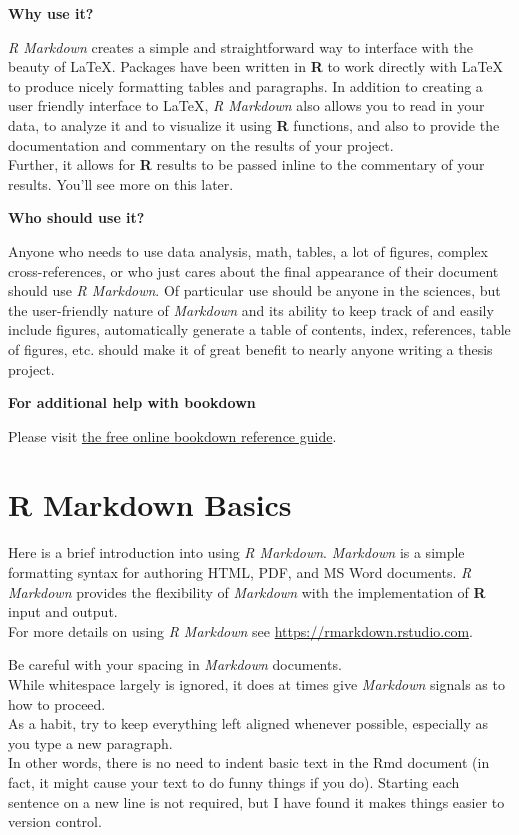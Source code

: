 \documentclass[12pt,oneside]{tisemthesis}
\begin{document}
\textbf{Why use it?}

\emph{R Markdown} creates a simple and straightforward way to interface with the beauty of LaTeX. Packages have been written in \textbf{R} to work directly with LaTeX to produce nicely formatting tables and paragraphs. In addition to creating a user friendly interface to LaTeX, \emph{R Markdown} also allows you to read in your data, to analyze it and to visualize it using \textbf{R} functions, and also to provide the documentation and commentary on the results of your project.\\
Further, it allows for \textbf{R} results to be passed inline to the commentary of your results. You'll see more on this later.

\textbf{Who should use it?}

Anyone who needs to use data analysis, math, tables, a lot of figures, complex cross-references, or who just cares about the final appearance of their document should use \emph{R Markdown}. Of particular use should be anyone in the sciences, but the user-friendly nature of \emph{Markdown} and its ability to keep track of and easily include figures, automatically generate a table of contents, index, references, table of figures, etc. should make it of great benefit to nearly anyone writing a thesis project.

\textbf{For additional help with bookdown}

Please visit \href{https://bookdown.org/yihui/bookdown/}{the free online bookdown reference guide}.

\hypertarget{rmd-basics}{%
\chapter{R Markdown Basics}\label{rmd-basics}}

Here is a brief introduction into using \emph{R Markdown}. \emph{Markdown} is a simple formatting syntax for authoring HTML, PDF, and MS Word documents. \emph{R Markdown} provides the flexibility of \emph{Markdown} with the implementation of \textbf{R} input and output.\\
For more details on using \emph{R Markdown} see \url{https://rmarkdown.rstudio.com}.

Be careful with your spacing in \emph{Markdown} documents.\\
While whitespace largely is ignored, it does at times give \emph{Markdown} signals as to how to proceed.\\
As a habit, try to keep everything left aligned whenever possible, especially as you type a new paragraph.\\
In other words, there is no need to indent basic text in the Rmd document (in fact, it might cause your text to do funny things if you do).
Starting each sentence on a new line is not required, but I have found it makes things easier to version control.
\end{document}
